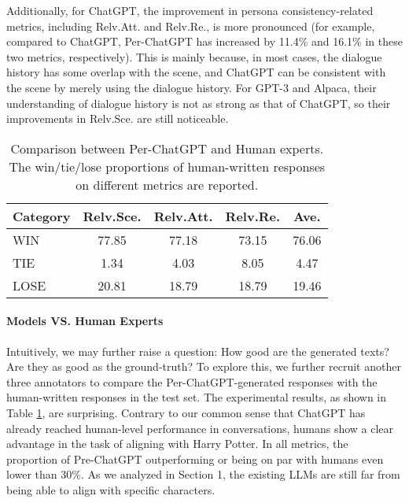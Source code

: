 \documentclass[11pt]{article}
\begin{document}
Additionally, for ChatGPT, the improvement in persona consistency-related metrics, including Relv.Att. and Relv.Re., is more pronounced (for example, compared to ChatGPT, Per-ChatGPT has increased by 11.4\% and 16.1\% in these two metrics, respectively). This is mainly because, in most cases, the dialogue history has some overlap with the scene, and ChatGPT can be consistent with the scene by merely using the dialogue history. For GPT-3 and Alpaca, their understanding of dialogue history is not as strong as that of ChatGPT, so their improvements in Relv.Sce. are still noticeable.

















\begin{table}[t]
    \begin{center}
    \centering
    \small
\begin{tabular}{l|cccc}
    \toprule
   \multirow{1}{*}{\textbf{Category}} 
 & \textbf{Relv.Sce.} & \textbf{Relv.Att.} & \textbf{Relv.Re.} &\textbf{Ave.} \\
    \midrule


WIN & 77.85 &77.18&73.15&76.06\\
TIE &1.34&4.03&8.05&4.47 \\
LOSE &20.81&18.79&18.79&19.46 \\


    \bottomrule
    \end{tabular}
    \end{center}
    \caption{
Comparison between Per-ChatGPT and Human experts. The win/tie/lose proportions of human-written responses on different metrics are reported. 
    }
    \vspace{-10pt}
    
    \label{tab:human_rank}
\end{table} 
\paragraph{Models VS. Human Experts}


Intuitively, we may further raise a question: How good are the generated texts? Are they as good as the ground-truth? To explore this, we further recruit another three annotators to compare the Per-ChatGPT-generated responses with the human-written responses in the test set. The experimental results, as shown in Table \ref{tab:human_rank}, are surprising. Contrary to our common sense that ChatGPT has already reached human-level performance in conversations, humans show a clear advantage in the task of aligning with Harry Potter. In all metrics, the proportion of Pre-ChatGPT outperforming or being on par with humans even lower than 30\%. As we analyzed in Section 1, the existing LLMs are still far from being able to align with specific characters.
\end{document}
